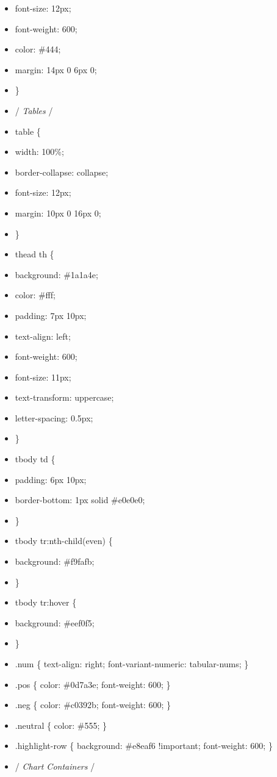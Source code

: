 \documentclass[11pt]{article}
\begin{document}
\begin{itemize}[leftmargin=*,itemsep=2pt,topsep=2pt]
\item {} font-size: 12px;
\item {} font-weight: 600;
\item {} color: \#444;
\item {} margin: 14px 0 6px 0;
\item {} \}
\item {} /\emph{ Tables }/
\item {} table \{
\item {} width: 100\%;
\item {} border-collapse: collapse;
\item {} font-size: 12px;
\item {} margin: 10px 0 16px 0;
\item {} \}
\item {} thead th \{
\item {} background: \#1a1a4e;
\item {} color: \#fff;
\item {} padding: 7px 10px;
\item {} text-align: left;
\item {} font-weight: 600;
\item {} font-size: 11px;
\item {} text-transform: uppercase;
\item {} letter-spacing: 0.5px;
\item {} \}
\item {} tbody td \{
\item {} padding: 6px 10px;
\item {} border-bottom: 1px solid \#e0e0e0;
\item {} \}
\item {} tbody tr:nth-child(even) \{
\item {} background: \#f9fafb;
\item {} \}
\item {} tbody tr:hover \{
\item {} background: \#eef0f5;
\item {} \}
\item {} .num \{ text-align: right; font-variant-numeric: tabular-nums; \}
\item {} .pos \{ color: \#0d7a3e; font-weight: 600; \}
\item {} .neg \{ color: \#c0392b; font-weight: 600; \}
\item {} .neutral \{ color: \#555; \}
\item {} .highlight-row \{ background: \#e8eaf6 !important; font-weight: 600; \}
\item {} /\emph{ Chart Containers }/

\end{itemize}
\end{document}
